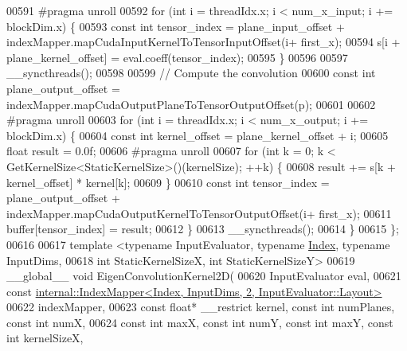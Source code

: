 \begin{DoxyCode}
00591 \textcolor{preprocessor}{    #pragma unroll}
00592     \textcolor{keywordflow}{for} (\textcolor{keywordtype}{int} i = threadIdx.x; i < num\_x\_input; i += blockDim.x) \{
00593       \textcolor{keyword}{const} \textcolor{keywordtype}{int} tensor\_index = plane\_input\_offset + indexMapper.mapCudaInputKernelToTensorInputOffset(i+
      first\_x);
00594       s[i + plane\_kernel\_offset] = eval.coeff(tensor\_index);
00595     \}
00596 
00597     \_\_syncthreads();
00598 
00599     \textcolor{comment}{// Compute the convolution}
00600     \textcolor{keyword}{const} \textcolor{keywordtype}{int} plane\_output\_offset = indexMapper.mapCudaOutputPlaneToTensorOutputOffset(p);
00601 
00602 \textcolor{preprocessor}{    #pragma unroll}
00603     \textcolor{keywordflow}{for} (\textcolor{keywordtype}{int} i = threadIdx.x; i < num\_x\_output; i += blockDim.x) \{
00604       \textcolor{keyword}{const} \textcolor{keywordtype}{int} kernel\_offset = plane\_kernel\_offset + i;
00605       \textcolor{keywordtype}{float} result = 0.0f;
00606 \textcolor{preprocessor}{      #pragma unroll}
00607       \textcolor{keywordflow}{for} (\textcolor{keywordtype}{int} k = 0; k < GetKernelSize<StaticKernelSize>()(kernelSize); ++k) \{
00608         result += s[k + kernel\_offset] * kernel[k];
00609       \}
00610       \textcolor{keyword}{const} \textcolor{keywordtype}{int} tensor\_index = plane\_output\_offset + indexMapper.mapCudaOutputKernelToTensorOutputOffset(i+
      first\_x);
00611       buffer[tensor\_index] = result;
00612     \}
00613     \_\_syncthreads();
00614   \}
00615 \};
00616 
00617 \textcolor{keyword}{template} <\textcolor{keyword}{typename} InputEvaluator, \textcolor{keyword}{typename} \hyperlink{namespace_eigen_a62e77e0933482dafde8fe197d9a2cfde}{Index}, \textcolor{keyword}{typename} InputDims,
00618           \textcolor{keywordtype}{int} StaticKernelSizeX, \textcolor{keywordtype}{int} StaticKernelSizeY>
00619 \_\_global\_\_ \textcolor{keywordtype}{void} EigenConvolutionKernel2D(
00620     InputEvaluator eval,
00621     \textcolor{keyword}{const} \hyperlink{class_eigen_1_1internal_1_1_index_mapper}{internal::IndexMapper<Index, InputDims, 2, InputEvaluator::Layout>}
00622         indexMapper,
00623     \textcolor{keyword}{const} \textcolor{keywordtype}{float}* \_\_restrict kernel, \textcolor{keyword}{const} \textcolor{keywordtype}{int} numPlanes, \textcolor{keyword}{const} \textcolor{keywordtype}{int} numX,
00624     \textcolor{keyword}{const} \textcolor{keywordtype}{int} maxX, \textcolor{keyword}{const} \textcolor{keywordtype}{int} numY, \textcolor{keyword}{const} \textcolor{keywordtype}{int} maxY, \textcolor{keyword}{const} \textcolor{keywordtype}{int} kernelSizeX,

\end{DoxyCode}
